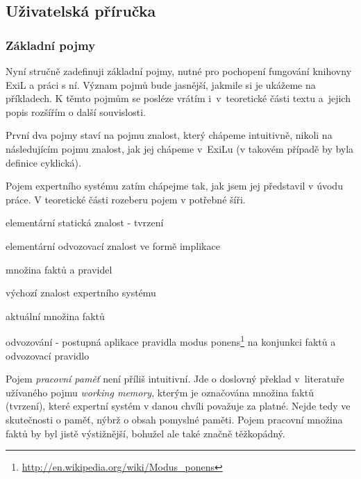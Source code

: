 \subsection{Uživatelská příručka}
\subsubsection{Základní pojmy}

Nyní stručně zadefinuji základní pojmy, nutné pro pochopení fungování knihovny
ExiL a práci s ní. Význam pojmů bude jasnější, jakmile si je ukážeme na
příkladech. K těmto pojmům se posléze vrátím i~v~teoretické části textu
a~jejich popis rozšířím o další souvislosti.

První dva pojmy staví na pojmu znalost, který chápeme intuitivně, nikoli na
následujícím pojmu znalost, jak jej chápeme v~ExiLu (v takovém případě by byla
definice cyklická).

Pojem expertního systému zatím chápejme tak, jak jsem jej představil v úvodu
práce. V teoretické části rozeberu pojem v potřebné šíři.
\begin{description}[leftmargin=5cm,style=sameline,align=right,labelsep=0.5cm]
  \item[fakt] elementární statická znalost - tvrzení
  \item[(odvozovací) pravidlo] elementární odvozovací znalost ve formě implikace
  \item[znalost (v ExiLu)] množina faktů a pravidel
  \item[znalostní báze] výchozí znalost expertního systému
  \item[pracovní paměť] aktuální množina faktů
  \item[inference] odvozování - postupná aplikace pravidla modus
    ponens\footnote{\url{http://en.wikipedia.org/wiki/Modus_ponens}} na
    konjunkci faktů a odvozovací pravidlo
\end{description}
Pojem \emph{pracovní paměť} není příliš intuitivní. Jde o doslovný překlad
v~literatuře užívaného pojmu \emph{working memory}, kterým je označována množina
faktů (tvrzení), které expertní systém v danou chvíli považuje za platné. Nejde
tedy ve skutečnosti o paměť, nýbrž o obsah pomyslné paměti. Pojem pracovní
množina faktů by byl jistě výstižnější, bohužel ale také značně těžkopádný.













